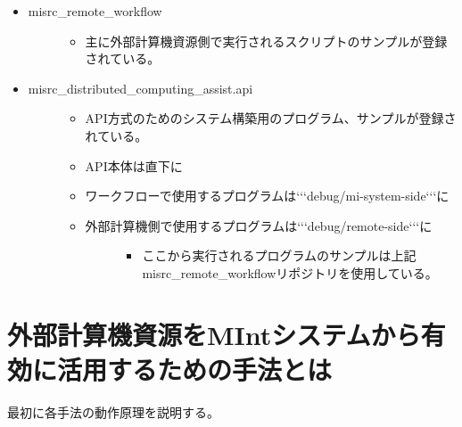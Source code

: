 \documentclass[letterpaper,10pt,dvipdfmx,openany]{sphinxmanual}
\begin{document}
\begin{itemize}
\item {} \begin{description}
\item[{misrc\_remote\_workflow}] \leavevmode\begin{itemize}
\item {} 
主に外部計算機資源側で実行されるスクリプトのサンプルが登録されている。

\end{itemize}

\end{description}

\item {} \begin{description}
\item[{misrc\_distributed\_computing\_assist.api}] \leavevmode\begin{itemize}
\item {} 
API方式のためのシステム構築用のプログラム、サンプルが登録されている。

\item {} 
API本体は直下に

\item {} 
ワークフローで使用するプログラムは{}`{}`{}`debug/mi-system-side{}`{}`{}`に

\item {} \begin{description}
\item[{外部計算機側で使用するプログラムは{}`{}`{}`debug/remote-side{}`{}`{}`に}] \leavevmode\begin{itemize}
\item {} 
ここから実行されるプログラムのサンプルは上記misrc\_remote\_workflowリポジトリを使用している。

\end{itemize}

\end{description}

\end{itemize}

\end{description}

\end{itemize}


\chapter{外部計算機資源をMIntシステムから有効に活用するための手法とは}
\label{\detokenize{using_distributed_properties:mint}}
最初に各手法の動作原理を説明する。
\end{document}
